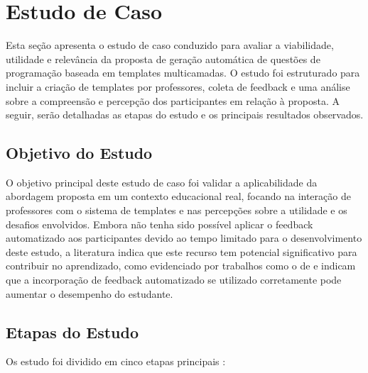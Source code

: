 \chapter{Estudo de Caso}

Esta seção apresenta o estudo de caso conduzido para avaliar a viabilidade, utilidade e relevância da proposta de geração automática de questões de programação baseada em templates multicamadas. O estudo foi estruturado para incluir a criação de templates por professores, coleta de feedback e uma análise sobre a compreensão e percepção dos participantes em relação à proposta. A seguir,  serão detalhadas as etapas do estudo e os principais resultados observados. 

\section{Objetivo do Estudo}
O objetivo principal deste estudo de caso foi validar a aplicabilidade da abordagem proposta em um contexto educacional real, focando na interação de professores com o sistema de templates e nas percepções sobre a utilidade e os desafios envolvidos. Embora não tenha sido possível aplicar o feedback automatizado aos participantes devido ao tempo limitado para o desenvolvimento deste estudo, a literatura  indica que este recurso tem potencial significativo para contribuir no aprendizado, como evidenciado por trabalhos como o de \parencite{vanpraet2024} e \parencite{fung2024} indicam que a incorporação de feedback automatizado se utilizado corretamente pode aumentar o desempenho do estudante.


\section{Etapas do Estudo}

Os estudo foi dividido em cinco etapas principais : 

